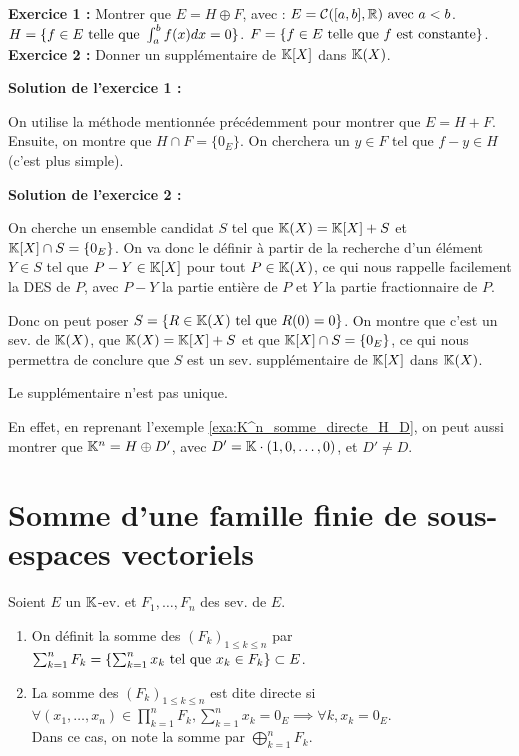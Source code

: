 \documentclass[12pt, a4paper]{report}
\begin{document}
\begin{exercise}
    \begin{outline}
        \1 \textbf{Exercice 1 :} Montrer que $E = H \oplus F$, avec :
        \2 $E = \mathcal{C}([a,b],\mathbb{R}) \text{ avec } a < b$.
        \2 $H = \{f \in E \text{ telle que } \int_a^b f(x) dx = 0\}$.
        \2 $F = \{f \in E \text{ telle que } f \text{ est constante}\}$.
        \1 \textbf{Exercice 2 :} Donner un supplémentaire de $\mathbb{K}[X]$ dans $\mathbb{K}(X)$.
    \end{outline}

    \textbf{Solution de l'exercice 1 :}

    On utilise la méthode mentionnée précédemment pour montrer que $E = H + F$. Ensuite, on montre que $H\cap F = \{0_E\}$. On cherchera un $y \in F$ tel que $f-y \in H$ (c'est plus simple).

    \textbf{Solution de l'exercice 2 :}

    On cherche un ensemble candidat $S$ tel que $\mathbb{K}(X) = \mathbb{K}[X] + S$ et $\mathbb{K}[X] \cap S = \{0_E\}$. On va donc le définir à partir de la recherche d'un élément $Y \in S$ tel que $P-Y \in \mathbb{K}[X]$ pour tout $P \in \mathbb{K}(X)$, ce qui nous rappelle facilement la DES de $P$, avec $P-Y$ la partie entière de $P$ et $Y$ la partie fractionnaire de $P$.
    
    Donc on peut poser $S = \{R \in \mathbb{K}(X) \text{ tel que } R(0) = 0\}$. On montre que c'est un sev. de $\mathbb{K}(X)$, que $\mathbb{K}(X) = \mathbb{K}[X] + S$ et que $\mathbb{K}[X] \cap S = \{0_E\}$, ce qui nous permettra de conclure que $S$ est un sev. supplémentaire de $\mathbb{K}[X]$ dans $\mathbb{K}(X)$.

    \label{exo:supplementaires_divers}
\end{exercise}

\begin{remark}
    Le supplémentaire n'est pas unique.

    En effet, en reprenant l'exemple \ref{exa:K^n_somme_directe_H_D}, on peut aussi montrer que $\mathbb{K}^n = H \oplus D'$, avec $D' = \mathbb{K} \cdot (1,0,\dots,0)$, et $D' \ne D$.
\end{remark}

\section{Somme d'une famille finie de sous-espaces vectoriels}

\begin{definition}
    Soient $E$ un $\mathbb{K}$-ev. et $F_1,\dots,F_n$ des sev. de $E$.

    \begin{enumerate}
        \item On définit la somme des $(F_k)_{1\le k \le n}$ par $\sum_{k=1}^n F_k = \{\sum_{k=1}^n x_k \text{ tel que } x_k \in F_k\} \subset E$.
        \item La somme des $(F_k)_{1\le k \le n}$ est dite directe si $\forall (x_1,\dots,x_n) \in \prod_{k=1}^n F_k, \sum_{k=1}^n x_k = 0_E \implies \forall k, x_k = 0_E$.\\Dans ce cas, on note la somme par $\bigoplus_{k=1}^n F_k$.
    \end{enumerate}
\end{definition}
\end{document}
